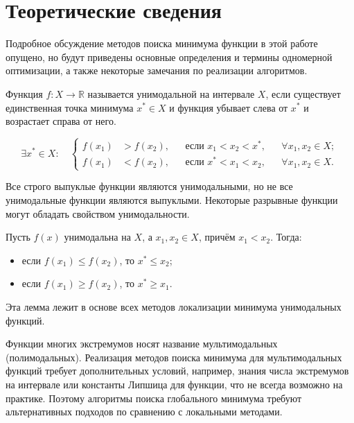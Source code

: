 \section{Теоретические сведения}
Подробное обсуждение методов поиска минимума функции в этой работе опущено,
но будут приведены основные определения и термины одномерной оптимизации, а также 
некоторые замечания по реализации алгоритмов.

\begin{definition}
Функция $f \colon X \to \mathbb{R}$ называется унимодальной на
интервале $X$, если существует единственная точка минимума
$x^* \in X$ и функция убывает слева от $x^*$ и возрастает справа от него.
\end{definition}


\begin{equation}
\exists x^* \in X:
\quad
\left\{
\begin{aligned}
    f(x_1) &> f(x_2),
    && \text{если } x_1 < x_2 < x^*,
    && \forall x_1, x_2 \in X; \\[0.3em]
    f(x_1) &< f(x_2),
    && \text{если } x^* < x_1 < x_2,
    && \forall x_1, x_2 \in X.
\end{aligned}
\right.
\end{equation}


Все строго выпуклые функции являются унимодальными, но не все унимодальные функции являются выпуклыми.
Некоторые разрывные функции могут обладать свойством унимодальности. 

\begin{lemma}
Пусть $f(x)$ унимодальна на $X$, а $x_1, x_2 \in X$,
причём $x_1 < x_2$. Тогда:

\begin{itemize}
    \item если $f(x_1) \leq f(x_2)$, то $x^* \leq x_2$;
    \item если $f(x_1) \geq f(x_2)$, то $x^* \geq x_1$.
\end{itemize}
\end{lemma}
Эта лемма лежит в основе всех методов локализации минимума
унимодальных функций.

Функции многих экстремумов носят название мультимодальных (полимодальных).
Реализация методов поиска минимума для мультимодальных функций требует дополнительных
условий, например, знания числа экстремумов на интервале или константы Липшица для функции, 
что не всегда возможно на практике. Поэтому алгоритмы поиска глобального
минимума требуют альтернативных подходов по сравнению с локальными методами.

